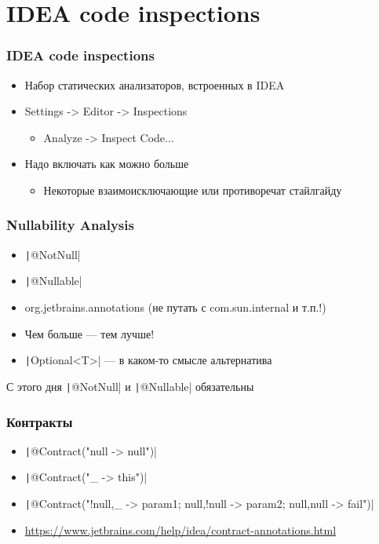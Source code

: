 \documentclass[xetex,mathserif,serif]{beamer}
\begin{document}
	\section{IDEA code inspections}

	\begin{frame}
		\frametitle{IDEA code inspections}
		\begin{itemize}
			\item Набор статических анализаторов, встроенных в IDEA
			\item Settings -> Editor -> Inspections
			\begin{itemize}
				\item Analyze -> Inspect Code...
			\end{itemize}
			\item Надо включать как можно больше
			\begin{itemize}
				\item Некоторые взаимоисключающие или противоречат стайлгайду
			\end{itemize}
		\end{itemize}
	\end{frame}

	\begin{frame}
		\frametitle{Nullability Analysis}
		\begin{itemize}
			\item \texttt|@NotNull|
			\item \texttt|@Nullable|
			\item org.jetbrains.annotations (не путать с com.sun.internal и т.п.!)
			\item Чем больше --- тем лучше!
			\item \texttt|Optional<T>| --- в каком-то смысле альтернатива
		\end{itemize}
		С этого дня \texttt|@NotNull| и \texttt|@Nullable| обязательны
	\end{frame}

	\begin{frame}
		\frametitle{Контракты}
		\begin{itemize}
			\item \texttt|@Contract("null -> null")|
			\item \texttt|@Contract("_ -> this")|
			\item \texttt|@Contract("!null,_ -> param1; null,!null -> param2; null,null -> fail")|
			\item \url{https://www.jetbrains.com/help/idea/contract-annotations.html}
		\end{itemize}
	\end{frame}
\end{document}
